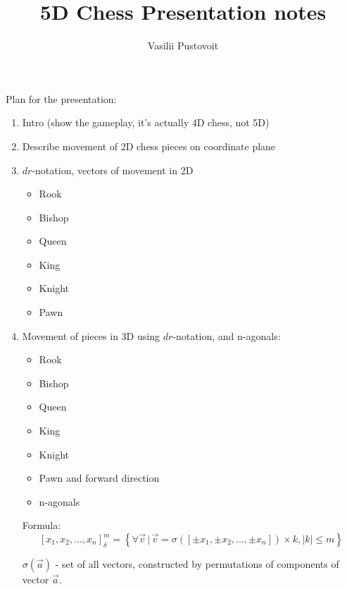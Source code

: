 


\author{Vasilii Pustovoit}
\title{5D Chess Presentation notes}

\maketitle

Plan for the presentation:

\begin{enumerate}
	\item Intro (show the gameplay, it's actually 4D chess, not 5D)
	\item Describe movement of 2D chess pieces on coordinate plane
	\item $dr$-notation, vectors of movement in 2D
	    \begin{itemize}
	        \item Rook
	        \item Bishop
	        \item Queen
	        \item King
	        \item Knight
			\item Pawn
	    \end{itemize}
	\item Movement of pieces in 3D using $dr$-notation, and n-agonals:
	    \begin{itemize}
	        \item Rook
	        \item Bishop
	        \item Queen
	        \item King
	        \item Knight
			\item Pawn and forward direction
			\item n-agonals
	    \end{itemize}
		Formula:
		\[
			[ x_1, x_2, ..., x_n ]^{m}_{\delta} =
			\left\{ \forall \Vec{v} \, | \,  \Vec{v} = 
				\sigma \left( [ \pm x_1, \pm x_2, ..., \pm x_n ] \right) \times k, 
		        \left| k \right| \le m \right\}	
		\]

		$\sigma ( \Vec{a} )$ - set of all vectors, constructed by permutations of components of vector $\Vec{a}$.
		

\end{enumerate}
